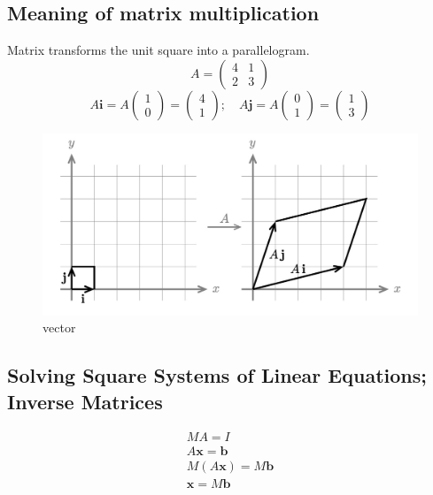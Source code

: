 \documentclass{article}
\begin{document}
\subsection{Meaning of matrix multiplication}
Matrix transforms the unit square into a parallelogram.
$$A =
  \begin{pmatrix}
    4 & 1 \\
    2 & 3
  \end{pmatrix}
$$
$$A\textbf{i} = A
  \begin{pmatrix}
    1 \\
    0
  \end{pmatrix} =
  \begin{pmatrix}
    4 \\
    1
  \end{pmatrix};\quad
  A\textbf{j} = A
  \begin{pmatrix}
    0 \\
    1
  \end{pmatrix} =
  \begin{pmatrix}
    1 \\
    3
  \end{pmatrix}
$$

\begin{figure}[htbp]
  \centering
  \includegraphics[width=.8\textwidth]{matrix_multiplication.png}
  \caption{vector}
  \label{vector}
\end{figure}

\subsection{Solving Square Systems of Linear Equations; Inverse Matrices}
\begin{gather*}
  MA = I \\
  A\textbf{x} = \textbf{b} \\
  M(A\textbf{x}) = M\textbf{b} \\
  \textbf{x} = M\textbf{b}
\end{gather*}
\end{document}
